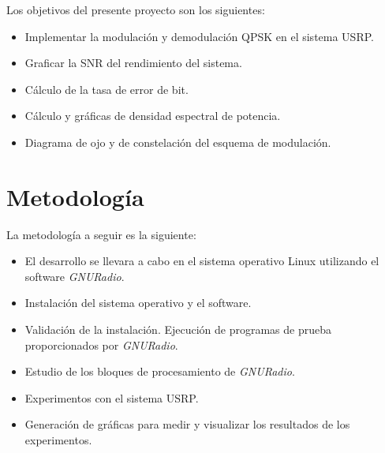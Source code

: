 Los objetivos del presente proyecto son los siguientes:
\begin{itemize}
  \item Implementar la modulaci\'on y demodulaci\'on QPSK en el sistema USRP.
  \item Graficar la SNR del rendimiento del sistema.
  \item C\'alculo de la tasa de error de bit.
  \item C\'alculo y gr\'aficas de densidad espectral de potencia.
  \item Diagrama de ojo y de constelaci\'on del esquema de modulaci\'on.
\end{itemize}

\section{Metodolog\'ia}

La metodolog\'ia a seguir es la siguiente:
\begin{itemize}
  \item El desarrollo se llevara a cabo en el sistema operativo Linux
  utilizando el software \emph{GNURadio}.
  \item Instalaci\'on del sistema operativo y el software.
  \item Validaci\'on de la instalaci\'on. Ejecuci\'on de programas de prueba
  proporcionados por \emph{GNURadio}.
  \item Estudio de los bloques de procesamiento de \emph{GNURadio}.
  \item Experimentos con el sistema USRP.
  \item Generaci\'on de gr\'aficas para medir y visualizar los resultados de los
  experimentos.
\end{itemize}